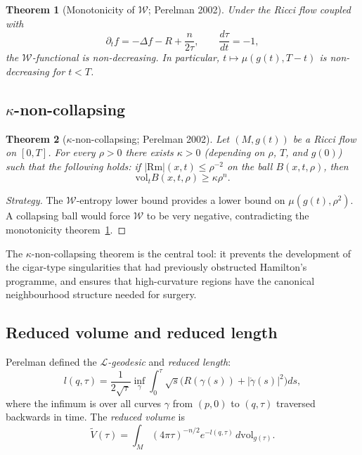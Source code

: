 \documentclass[12pt,a4paper]{amsart}
\newtheorem{theorem}{Theorem}[section]
\theoremstyle{definition}
\theoremstyle{remark}
\newcommand{\Rm}{\mathrm{Rm}}
\newcommand{\vol}{\mathrm{vol}}
\begin{document}
\begin{theorem}[Monotonicity of $\mathcal{W}$; Perelman 2002]
\label{thm:W-mono}
Under the Ricci flow coupled with
\[
  \partial_t f = -\Delta f - R + \frac{n}{2\tau}, \qquad
  \frac{d\tau}{dt} = -1,
\]
the $\mathcal{W}$-functional is non-decreasing.  In particular,
$t \mapsto \mu(g(t), T-t)$ is non-decreasing for $t < T$.
\end{theorem}

\subsection{$\kappa$-non-collapsing}

\begin{theorem}[$\kappa$-non-collapsing; Perelman 2002]
\label{thm:kappa}
Let $(M,g(t))$ be a Ricci flow on $[0,T]$.  For every $\rho > 0$ there
exists $\kappa > 0$ (depending on $\rho$, $T$, and $g(0)$) such that the
following holds: if $|\Rm|(x,t) \leq \rho^{-2}$ on the ball $B(x,t,\rho)$,
then
\[
  \vol_t B(x,t,\rho) \geq \kappa \rho^n.
\]
\end{theorem}

\begin{proof}[Strategy]
The $\mathcal{W}$-entropy lower bound provides a lower bound on
$\mu(g(t),\rho^2)$.  A collapsing ball would force $\mathcal{W}$ to be very
negative, contradicting the monotonicity theorem~\ref{thm:W-mono}.
\end{proof}

The $\kappa$-non-collapsing theorem is the central tool: it prevents the
development of the cigar-type singularities that had previously obstructed
Hamilton's programme, and ensures that high-curvature regions have the
canonical neighbourhood structure needed for surgery.

\subsection{Reduced volume and reduced length}

Perelman defined the \emph{$\mathcal{L}$-geodesic} and \emph{reduced length}:
\begin{equation}
  l(q,\tau) = \frac{1}{2\sqrt{\tau}}
    \inf_\gamma \int_0^\tau \sqrt{s}\bigl(R(\gamma(s)) + |\dot\gamma(s)|^2\bigr)ds,
\end{equation}
where the infimum is over all curves $\gamma$ from $(p,0)$ to $(q,\tau)$
traversed backwards in time.  The \emph{reduced volume} is
\begin{equation}
  \tilde V(\tau) = \int_M (4\pi\tau)^{-n/2} e^{-l(q,\tau)}\,d\vol_{g(\tau)}.
\end{equation}
\end{document}
